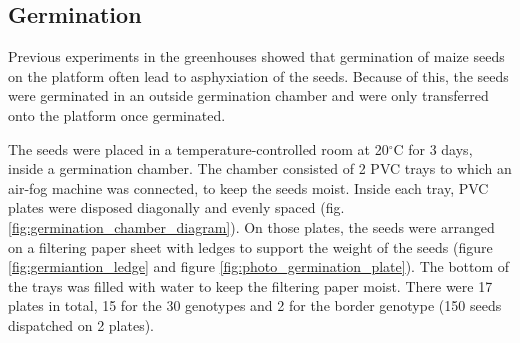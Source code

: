 \subsection{Germination}
Previous experiments in the greenhouses showed that germination of maize seeds on the platform often lead to asphyxiation of the seeds. 
Because of this, the seeds were germinated in an outside germination chamber and were only transferred onto the platform once germinated.


The seeds were placed in a temperature-controlled room at 20$^{\circ}$C for 3 days, inside a germination chamber. The chamber consisted of 2 PVC trays to which an air-fog machine was connected, to keep the seeds moist. 
Inside each tray, PVC plates were disposed diagonally and evenly spaced (fig. \ref{fig:germination_chamber_diagram}). On those plates, the seeds were arranged on a filtering paper sheet with ledges to support the weight of the seeds (figure \ref{fig:germiantion_ledge} and figure \ref{fig:photo_germination_plate}). The bottom of the trays was filled with water to keep the filtering paper moist. 
There were 17 plates in total, 15 for the 30 genotypes and 2 for the border genotype (150 seeds dispatched on 2 plates). 

